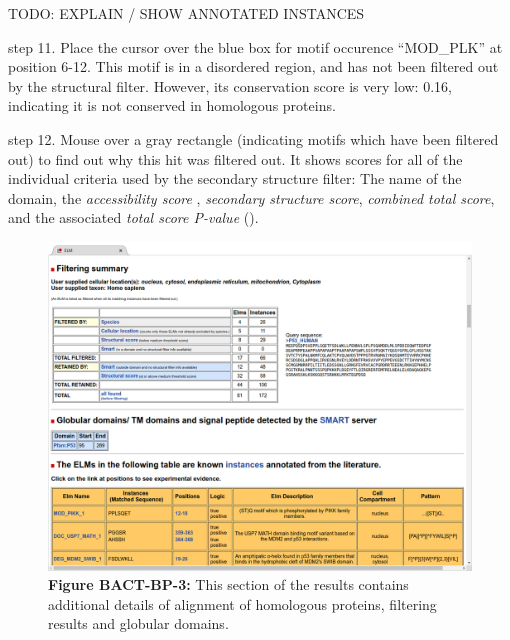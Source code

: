 TODO: EXPLAIN / SHOW ANNOTATED INSTANCES


step 11. Place the cursor over the blue box for motif occurence
``MOD\_PLK'' at position 6-12. This motif is in a disordered region, and
has not been filtered out by the structural filter. However, its
conservation score is very low: 0.16, indicating it is not conserved in
homologous proteins.


step 12. Mouse over a gray rectangle (indicating motifs which have been
filtered out) to find out why this hit was filtered out. It shows scores
for all of the individual criteria used by the secondary structure
filter: The name of the domain, the \emph{accessibility score} ,
\emph{secondary structure score}, \emph{combined total score}, and the
associated \emph{total score P-value} (\cite{19852836}).

\begin{figure}[h!]
\centering
\includegraphics[width=\textwidth]{Figures/TP53_1/elm_results_alignments_filtering_domains.png}
\caption{
\textbf{Figure BACT-BP-3:} This section of the results contains
additional details of alignment of homologous proteins, filtering
results and globular domains.
}
\end{figure}

